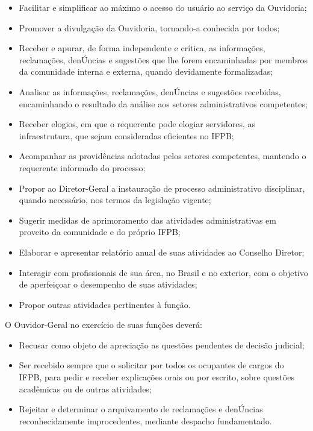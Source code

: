 \begin{itemize}
\item Facilitar e simplificar ao máximo o acesso do usuário ao serviço da Ouvidoria;

\item Promover a divulgação da Ouvidoria, tornando-a conhecida por todos;

\item Receber e apurar, de forma independente e crítica, as informações, reclamações, denÚncias e sugestões que lhe forem encaminhadas por membros da comunidade interna e externa, quando devidamente formalizadas;

\item Analisar as informações, reclamações, denÚncias e sugestões recebidas, encaminhando o resultado da análise aos setores administrativos competentes;

\item Receber elogios, em que o requerente pode elogiar servidores, as infraestrutura, que sejam consideradas eficientes no IFPB;

\item Acompanhar as providências adotadas pelos setores competentes, mantendo o requerente informado do processo;

\item Propor ao Diretor-Geral a instauração de processo administrativo disciplinar, quando necessário, nos termos da legislação vigente;

\item Sugerir medidas de aprimoramento das atividades administrativas em proveito da comunidade e do próprio IFPB;

\item Elaborar e apresentar relatório anual de suas atividades ao Conselho Diretor;

\item Interagir com profissionais de sua área, no Brasil e no exterior, com o objetivo de aperfeiçoar o desempenho de suas atividades;

\item Propor outras atividades pertinentes à função.

\end{itemize}

      O Ouvidor-Geral no exercício de suas funções deverá:

\begin{itemize}
\item Recusar como objeto de apreciação as questões pendentes de decisão judicial;

\item Ser recebido sempre que o solicitar por todos os ocupantes de cargos do IFPB, para pedir e receber explicações orais ou por escrito, sobre questões acadêmicas ou de outras atividades;

\item Rejeitar e determinar o arquivamento de reclamações e denÚncias reconhecidamente improcedentes, mediante despacho fundamentado.
\end{itemize}


